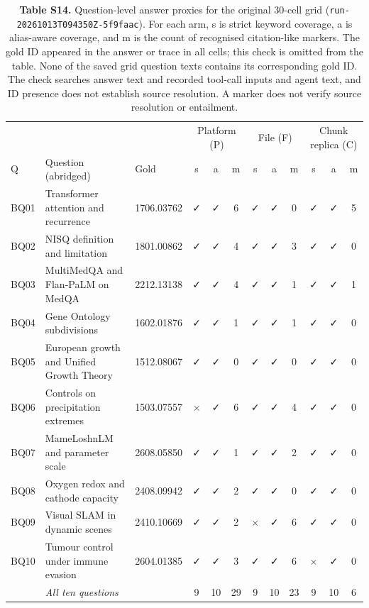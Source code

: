 \begin{table}
\centering
\small
\setlength{\tabcolsep}{3pt}
\caption{\textbf{Table S14.} Question-level answer proxies for the original 30-cell grid
(\texttt{run-20261013T094350Z-5f9faac}). For each arm, s is strict
keyword coverage, a is alias-aware coverage, and m is the count of
recognised citation-like markers. The gold ID appeared in the answer or
trace in all cells; this check is omitted from the table. None of the saved
grid question texts contains its corresponding gold ID. The check searches
answer text and recorded tool-call inputs and agent text, and ID presence
does not establish source resolution. A marker does not
verify source resolution or entailment.}

\begin{tabular}{@{}lp{4.950cm}l*{9}{c}@{}}
\toprule
 & & & \multicolumn{3}{c}{Platform (P)} & \multicolumn{3}{c}{File (F)} & \multicolumn{3}{c}{Chunk replica (C)}\\

Q & Question (abridged) & Gold & s & a & m & s & a & m & s & a & m\\
\midrule
BQ01 & Transformer attention and recurrence & 1706.03762 & ✓ & ✓ & 6 & ✓ & ✓ & 0 & ✓ & ✓ & 5\\
BQ02 & NISQ definition and limitation & 1801.00862 & ✓ & ✓ & 4 & ✓ & ✓ & 3 & ✓ & ✓ & 0\\
BQ03 & MultiMedQA and Flan-PaLM on MedQA & 2212.13138 & ✓ & ✓ & 4 & ✓ & ✓ & 1 & ✓ & ✓ & 1\\
BQ04 & Gene Ontology subdivisions & 1602.01876 & ✓ & ✓ & 1 & ✓ & ✓ & 1 & ✓ & ✓ & 0\\
BQ05 & European growth and Unified Growth Theory & 1512.08067 & ✓ & ✓ & 0 & ✓ & ✓ & 0 & ✓ & ✓ & 0\\
BQ06 & Controls on precipitation extremes & 1503.07557 & $\times$ & ✓ & 6 & ✓ & ✓ & 4 & ✓ & ✓ & 0\\
BQ07 & MameLoshnLM and parameter scale & 2608.05850 & ✓ & ✓ & 1 & ✓ & ✓ & 2 & ✓ & ✓ & 0\\
BQ08 & Oxygen redox and cathode capacity & 2408.09942 & ✓ & ✓ & 2 & ✓ & ✓ & 0 & ✓ & ✓ & 0\\
BQ09 & Visual SLAM in dynamic scenes & 2410.10669 & ✓ & ✓ & 2 & $\times$ & ✓ & 6 & ✓ & ✓ & 0\\
BQ10 & Tumour control under immune evasion & 2604.01385 & ✓ & ✓ & 3 & ✓ & ✓ & 6 & $\times$ & ✓ & 0\\
\midrule
 & \emph{All ten questions} & & 9 & 10 & 29 & 9 & 10 & 23 & 9 & 10 & 6\\
\bottomrule
\end{tabular}
\end{table}
